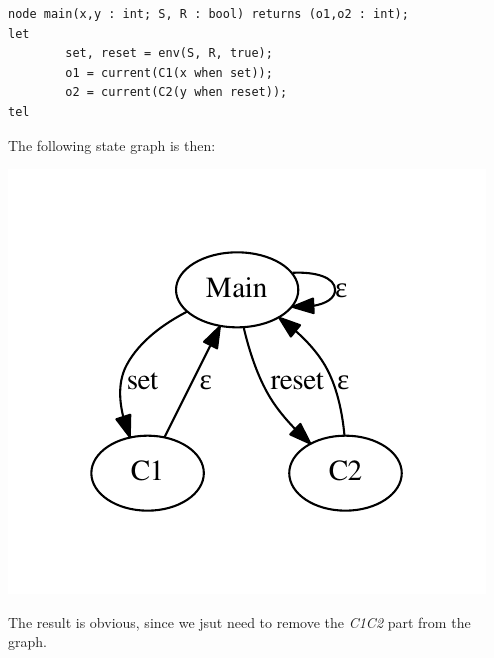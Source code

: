 \documentclass{article}
\begin{document}
\begin{verbatim}
node main(x,y : int; S, R : bool) returns (o1,o2 : int);
let
        set, reset = env(S, R, true);
        o1 = current(C1(x when set));
        o2 = current(C2(y when reset));
tel
\end{verbatim}

The following state graph is then:

\begin{center}
\includegraphics{asyn_strict.pdf}
\end{center}

The result is obvious, since we jsut need to remove the \emph{C1C2} part from
the graph.
\end{document}
